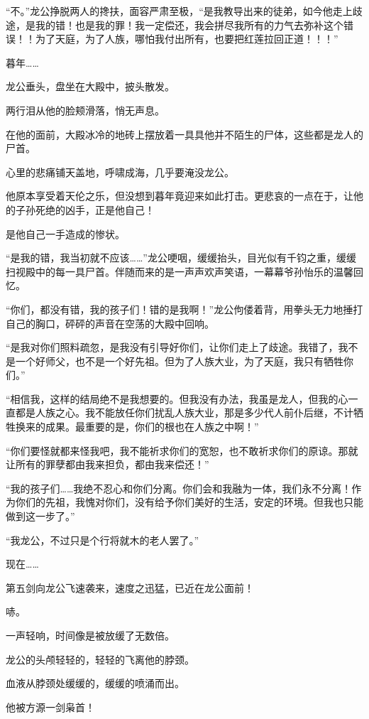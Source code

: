 \begin{this_body}
“不。”龙公挣脱两人的搀扶，面容严肃至极，“是我教导出来的徒弟，如今他走上歧途，是我的错！也是我的罪！我一定偿还，我会拼尽我所有的力气去弥补这个错误！！为了天庭，为了人族，哪怕我付出所有，也要把红莲拉回正道！！！”

暮年……

龙公垂头，盘坐在大殿中，披头散发。

两行泪从他的脸颊滑落，悄无声息。

在他的面前，大殿冰冷的地砖上摆放着一具具他并不陌生的尸体，这些都是龙人的尸首。

心里的悲痛铺天盖地，呼啸成海，几乎要淹没龙公。

他原本享受着天伦之乐，但没想到暮年竟迎来如此打击。更悲哀的一点在于，让他的子孙死绝的凶手，正是他自己！

是他自己一手造成的惨状。

“是我的错，我当初就不应该……”龙公哽咽，缓缓抬头，目光似有千钧之重，缓缓扫视殿中的每一具尸首。伴随而来的是一声声欢声笑语，一幕幕爷孙怡乐的温馨回忆。

“你们，都没有错，我的孩子们！错的是我啊！”龙公佝偻着背，用拳头无力地捶打自己的胸口，砰砰的声音在空荡的大殿中回响。

“是我对你们照料疏忽，是我没有引导好你们，让你们走上了歧途。我错了，我不是一个好师父，也不是一个好先祖。但为了人族大业，为了天庭，我只有牺牲你们。”

“相信我，这样的结局绝不是我想要的。但我没有办法，我虽是龙人，但我的心一直都是人族之心。我不能放任你们扰乱人族大业，那是多少代人前仆后继，不计牺牲换来的成果。最重要的是，你们的根也在人族之中啊！”

“你们要怪就都来怪我吧，我不能祈求你们的宽恕，也不敢祈求你们的原谅。那就让所有的罪孽都由我来担负，都由我来偿还！”

“我的孩子们……我绝不忍心和你们分离。你们会和我融为一体，我们永不分离！作为你们的先祖，我愧对你们，没有给予你们美好的生活，安定的环境。但我也只能做到这一步了。”

“我龙公，不过只是个行将就木的老人罢了。”

现在……

第五剑向龙公飞速袭来，速度之迅猛，已近在龙公面前！

哧。

一声轻响，时间像是被放缓了无数倍。

龙公的头颅轻轻的，轻轻的飞离他的脖颈。

血液从脖颈处缓缓的，缓缓的喷涌而出。

他被方源一剑枭首！

\end{this_body}

